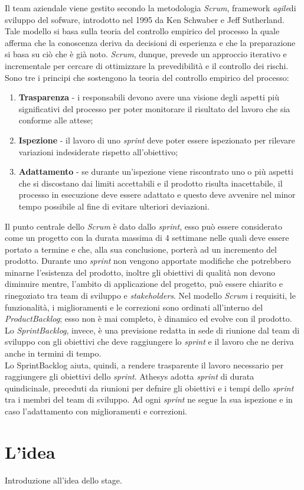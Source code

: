 Il team aziendale viene gestito secondo la metodologia \emph{\gls{Scrum}}\glsfirstoccur, framework \emph{\gls{agile}}\glsfirstoccur di sviluppo del sofware, introdotto nel 1995 da Ken Schwaber e Jeff Sutherland. Tale modello si basa sulla teoria del controllo empirico del processo la quale afferma che la conoscenza deriva da decisioni di esperienza e che la preparazione si basa su ciò che è già noto. \textit{Scrum}, dunque, prevede un approccio iterativo e incrementale per cercare di ottimizzare la prevedibilità e il controllo dei rischi. Sono tre i principi che sostengono la teoria del controllo empirico del processo:
\begin{enumerate}
	\item \textbf{Trasparenza} - i responsabili devono avere una visione degli aspetti più significativi del processo per poter monitorare il risultato del lavoro che sia conforme alle attese;
	\item \textbf{Ispezione} - il lavoro di uno \textit{sprint} deve poter essere ispezionato per rilevare variazioni indesiderate rispetto all'obiettivo;
	\item \textbf{Adattamento} - se durante un'ispezione viene riscontrato uno o più aspetti che si discostano dai limiti accettabili e il prodotto risulta inacettabile, il processo in esecuzione deve essere adattato e questo deve avvenire nel minor tempo possibile al fine di evitare ulteriori deviazioni.
\end{enumerate}
Il punto centrale dello \textit{Scrum} è dato dallo \textit{sprint}, esso può essere considerato come un progetto con la durata massima di 4 settimane nelle quali deve essere portato a termine e che, alla sua conclusione, porterà ad un incremento del prodotto. Durante uno \textit{sprint} non vengono apportate modifiche che potrebbero minarne l'esistenza del prodotto, inoltre gli obiettivi di qualità non devono diminuire mentre, l'ambito di applicazione del progetto, può essere chiarito e rinegoziato tra team di sviluppo e \textit{stakeholders}. Nel modello \textit{Scrum} i requisiti, le funzionalità, i miglioramenti e le correzioni sono ordinati all'interno del \emph{\gls{ProductBacklog}}\glsfirstoccur; esso non è mai completo, è dinamico ed evolve con il prodotto.\\
Lo \emph{\gls{SprintBacklog}}\glsfirstoccur, invece, è una previsione redatta in sede di riunione dal team di sviluppo con gli obiettivi che deve raggiungere lo \textit{sprint} e il lavoro che ne deriva anche in termini di tempo.\\
Lo \gls{SprintBacklog} aiuta, quindi, a rendere trasparente il lavoro necessario per raggiungere gli obiettivi dello \textit{sprint}.
Athesys adotta \textit{sprint} di durata quindicinale, preceduti da riunioni per defnire gli obiettivi e i tempi dello \textit{sprint} tra i membri del team di sviluppo. Ad ogni \textit{sprint} ne segue la sua ispezione e in caso l'adattamento con miglioramenti e correzioni.





\section{L'idea}

Introduzione all'idea dello stage.

